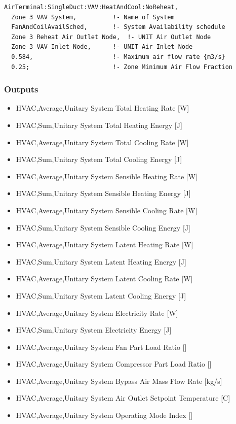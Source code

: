 \begin{lstlisting}
AirTerminal:SingleDuct:VAV:HeatAndCool:NoReheat,
  Zone 3 VAV System,          !- Name of System
  FanAndCoilAvailSched,       !- System Availability schedule
  Zone 3 Reheat Air Outlet Node,  !- UNIT Air Outlet Node
  Zone 3 VAV Inlet Node,      !- UNIT Air Inlet Node
  0.584,                      !- Maximum air flow rate {m3/s}
  0.25;                       !- Zone Minimum Air Flow Fraction
\end{lstlisting}

\subsubsection{Outputs}\label{outputs-7-011}

\begin{itemize}
\item
  HVAC,Average,Unitary System Total Heating Rate {[}W{]}
\item
  HVAC,Sum,Unitary System Total Heating Energy {[}J{]}
\item
  HVAC,Average,Unitary System Total Cooling Rate {[}W{]}
\item
  HVAC,Sum,Unitary System Total Cooling Energy {[}J{]}
\item
  HVAC,Average,Unitary System Sensible Heating Rate {[}W{]}
\item
  HVAC,Sum,Unitary System Sensible Heating Energy {[}J{]}
\item
  HVAC,Average,Unitary System Sensible Cooling Rate {[}W{]}
\item
  HVAC,Sum,Unitary System Sensible Cooling Energy {[}J{]}
\item
  HVAC,Average,Unitary System Latent Heating Rate {[}W{]}
\item
  HVAC,Sum,Unitary System Latent Heating Energy {[}J{]}
\item
  HVAC,Average,Unitary System Latent Cooling Rate {[}W{]}
\item
  HVAC,Sum,Unitary System Latent Cooling Energy {[}J{]}
\item
  HVAC,Average,Unitary System Electricity Rate {[}W{]}
\item
  HVAC,Sum,Unitary System Electricity Energy {[}J{]}
\item
  HVAC,Average,Unitary System Fan Part Load Ratio {[]}
\item
  HVAC,Average,Unitary System Compressor Part Load Ratio {[]}
\item
  HVAC,Average,Unitary System Bypass Air Mass Flow Rate {[}kg/s{]}
\item
  HVAC,Average,Unitary System Air Outlet Setpoint Temperature {[}C{]}
\item
  HVAC,Average,Unitary System Operating Mode Index {[]}
\end{itemize}

